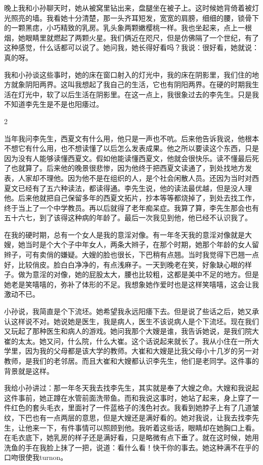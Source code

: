 晚上我和小孙聊天时，她从被窝里钻出来，盘腿坐在被子上。这时候她背倚着被灯光照亮的墙。我看她十分清楚，那一头齐耳短发，宽宽的肩膀，细细的腰，锁骨下的一颗黑痣，小巧精致的乳房。乳头象两颗嫩樱桃一样。我也坐起来，点上一根烟，她眼睛里就燃起了两颗火星。我们俩近在咫尺，但是仿佛隔了一个世纪，有了这种感觉，什么话都可以说了。她问我，她长得好看吗？我说：很好看，她就说：真的呀。 

我和小孙谈这些事时，她的床在窗口射入的灯光中，我的床在阴影里，我们住的地方就象阴阳两界。这叫我想起了我自己的生活，它也有阴阳两界。在硬的时期我生活在灯光中，软了以后生活在阴影里。在这一点上，我很象过去的李先生。只是我不知道李先生是不是也阳痿过。 

2 

当年我问李先生，西夏文有什么用，他只是一声也不吭。后来他告诉我说，他根本不想它有什么用，也不想读懂了以后怎么发表成果。他之所以要读这个东西，只是因为没有人能够读懂西夏文。假如他能读懂西夏文，他就会很快乐。读不懂最后死了也就算了。后来他的晚景很悲惨，因为他终于把西夏文读通了，到处找地方发表，人家却不理他。因为他不是在组织的人，是个社会闲散人员。还因为当时对西夏文已经有了五六种读法，都读得通。李先生说，他的读法最优越，但是没人理他。后来他就把自己保留多年的西夏文拓片，抄本等等都烧掉了，到处去找工作，终于当上了一个中学教员。再以后就得了老年痴呆症。我算了算，李先生那会也有五十六七，到了该得这种病的年龄了。最后一次我见到他，他已经不认识我了。 

在我的硬时期，总有一个女人是我的意淫对像。有一年冬天我的意淫对像就是大嫂，她当时是个大个子中年女人，两条大辫子，在那个时期，她那个年龄的女人留辫子，可有卖俏的嫌疑。大嫂的脸也很长，下巴稍有点翘。当时我觉得下巴翘一点好，比较俏皮。脸白白净净的，有点浅麻子。一天到晚老在笑，好象缺心眼的样子。做为意淫的对像，她的屁股太大，腰也比较粗，这都是美中不足的地方。但是她老是笑嘻嘻的，弥补了体形的不足。我想象她作爱时也是这样笑嘻嘻，这会让我激动不已。 

小孙说，我简直是个下流坯。她希望我永远阳痿下去。但是说了些话之后，她又承认这样说不对。她说她是医生，我是病人，医生不该说病人是个下流坯。现在我们又玩起了那种医生和病人的游戏。她问我那个大嫂是谁，我告诉她说，是我们院大崔的太太。她又问，什么院，什么大崔。这个话说起来就长了。我从小住在一所大学里，因为我的父母都是该大学的教师。大崔和大嫂是比我父母小十几岁的另一对教师，是我们的老邻居。而且大崔和大嫂都认识李先生，他们是老同学。这件事的背景就是这样。 

我给小孙讲过：那一年冬天我去找李先生，其实就是奉了大嫂之命。大嫂和我说起这件事前，她正蹲在水管前面洗带鱼。而和我说这事时，她站了起来，身上穿了一件红色的套头毛衣，里面衬了一件蓝格子的浅色衬衣。我看到她脖子上有了几道皱纹，下巴也有一点两层的意思，但是大嫂还是满好看的。她对我说，让我去找李先生，让他来一下，有件事情可以照顾到他。我听着这些话，眼睛却在她胸口上看。在毛衣底下，她乳房的样子还是满好看，只是略微有点下垂了。就在这时候，她用洗鱼的手在我脸上抹了一把，说道：看什么看！快干你的事去。她这种满不在乎的口吻很使我turnon。 

